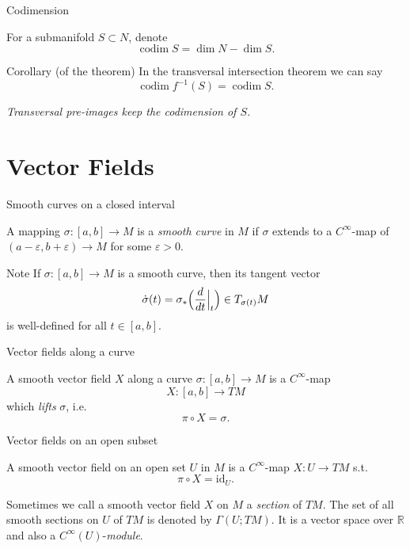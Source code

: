 \documentclass[10pt]{beamer}
\newcommand{\R}{\mathbb{R}}
\DeclareMathOperator{\codim}{codim}
\begin{document}
\begin{frame}{Codimension}
	\begin{definition}[Codimension]
		For a submanifold $S \subset N$, denote
		\[
			\codim S = \dim N - \dim S .
		\]
	\end{definition}
	\medskip
	\begin{block}{Corollary (of the theorem)}
		In the transversal intersection theorem we can say
		\[
			\codim f^{-1}(S) = \codim S .
		\]
	\end{block}
	\emph{Transversal pre-images keep the codimension of $S$.}
\end{frame}

\section{Vector Fields}

\begin{frame}{Smooth curves on a closed interval}
	\begin{definition}
		A mapping $\sigma : [a, b] \to M$ is a \emph{smooth curve} in
		$M$ if $\sigma$ extends to a $C^\infty$-map of
		$(a - \varepsilon, b + \varepsilon) \to M$ for some
		$\varepsilon > 0$.
	\end{definition}
	\begin{block}{Note}
		If $\sigma : [a, b] \to M$ is a smooth curve, then its tangent
		vector
		\[
			\dot{\sigma}(t)
			= \sigma_*\Bigl( \frac{d}{dt} \Big|_{t} \Bigr)
			\in T_{\sigma(t)} M
		\]
		is well-defined for all $t \in [a, b]$.
	\end{block}
\end{frame}

\begin{frame}[fragile]{Vector fields along a curve}
	\begin{definition}
		A smooth vector field $X$ along a curve
		$\sigma : [a, b] \to M$ is a $C^\infty$-map
		\[
			X : [a, b] \longrightarrow TM
		\]
		which \emph{lifts} $\sigma$, i.e.
		\[
			\pi \circ X = \sigma .
		\]
	\end{definition}
	\medskip
	\begin{center}
	\end{center}
\end{frame}

\begin{frame}{Vector fields on an open subset}
	\begin{definition}
		A smooth vector field on an open set $U$ in $M$ is a
		$C^\infty$-map $X : U \to TM$ s.t.
		\[
			\pi \circ X = \mathrm{id}_U .
		\]
	\end{definition}
	Sometimes we call a smooth vector field $X$ on $M$ a
	\emph{section} of $TM$. The set of all smooth sections on $U$ of
	$TM$ is denoted by $\Gamma(U; TM)$. It is a vector space over
	$\R$ and also a $C^\infty(U)$-\emph{module}.
\end{frame}
\end{document}
